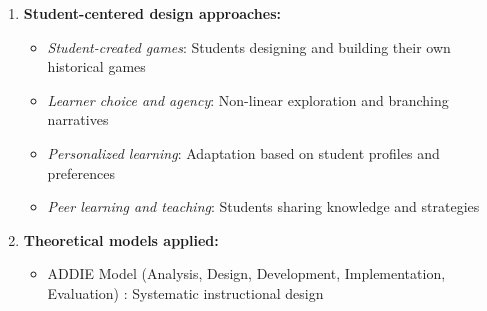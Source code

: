 \documentclass[a4paper,fleqn]{cas-sc}
\begin{document}
\begin{enumerate}[noitemsep]
\begin{itemize}[noitemsep]
 \item \textit{Milestone-based assessment}: Evaluation at key progression points 
 
 \item \textit{Multimedia content integration}: Combining text, audio, images, video, and 3D elements \citep{21Ghulamani2017, 23Zin2009322, 28Chao201734, 39Tegos2014838, 49Huizenga2007127, 58Shih2015173, 67Lin201296, 70Hou201519, 80gottlieb2018your}
 
 \item \textit{Adaptive learning pathways}: Content adjusted based on student performance \citep{15Slater2022, 38Mercik2024}
 
 \item \textit{Tutorial and guidance systems}: Structured introduction to game mechanics \citep{22Nugroho2020149, 40Kuran2018, 63Liu2021}
 
 \item \textit{Post-lesson review systems}: Gamified review within optimal time windows \citep{28Chao201734, 70Hou201519}
\end{itemize}

	\item 
\textbf{Student-centered design approaches:}
\begin{itemize}[noitemsep]
 \item \textit{Student-created games}: Students designing and building their own historical games \citep{25Repantis2011502, 42Huffer201581, 50Lye2013, 59Kee2014270, 60Hoy2018}
 
 \item \textit{Learner choice and agency}: Non-linear exploration and branching narratives \citep{15Slater2022, 29Stiso20201165, 36Scholz2021, 48Moketar2021, 59Kee2014270, 64Hsu201324}
 
 \item \textit{Personalized learning}: Adaptation based on student profiles and preferences \citep{15Slater2022, 52Lin2011265}
 
 \item \textit{Peer learning and teaching}: Students sharing knowledge and strategies \citep{28Chao201734, 30Zin2008, 67Lin201296}
\end{itemize}

	\item 
\textbf{Theoretical models applied:}
\begin{itemize}[noitemsep]
 \item ADDIE Model (Analysis, Design, Development, Implementation, Evaluation) \citep{2Mahamarowi2023133, 77Ramansyah2021}: Systematic instructional design
 

\end{itemize}
\end{enumerate}
\end{document}
